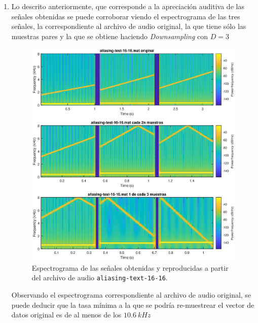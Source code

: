 \begin{enumerate}
    \item Lo descrito anteriormente, que corresponde a la apreciación auditiva de las señales obtenidas se puede corroborar viendo el espectrograma de las tres señales, la correspondiente al archivo de audio original, la que tiene sólo las muestras pares y la que se obtiene haciendo \textit{Downsampling} con $D = 3$
    
    
    \begin{figure}[H]
        \centering
        \includegraphics[scale = 0.5]{Imagenes/espectogramas.eps}
        \caption{Espectrograma de las señales obtenidas y reproducidas a partir del archivo de audio \texttt{aliasing-text-16-16}.}
        \label{fig:my_label}
    \end{figure}
    
    
    Observando el  espectrograma correspondiente al archivo de audio original, se puede deducir que la tasa mínima a la que se podría re-muestrear el vector de datos original es de al menos  de los $10.6~kHz$
\end{enumerate}

